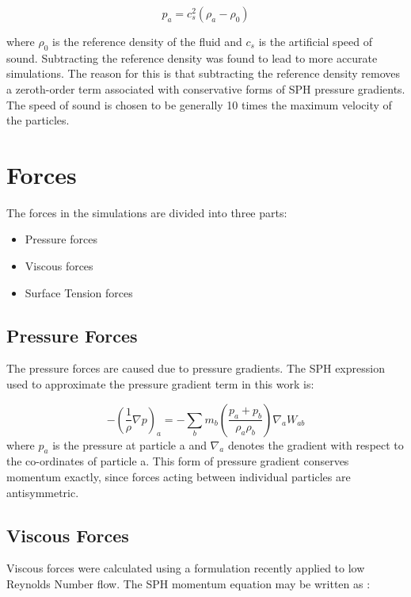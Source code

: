 \begin{equation}
 p_a = c_s^2 (\rho_a - \rho_0)
\end{equation}

\noindent
where $\rho_0$ is the reference density of the fluid and $c_s$ is the artificial speed of sound. Subtracting the reference density was found to lead to more accurate simulations. The reason for this is that subtracting the reference density removes a zeroth-order term associated with conservative forms of SPH pressure gradients. The speed of sound is chosen to be generally 10 times the maximum velocity of the particles. 

\section{Forces}

The forces in the simulations are divided into three parts:

\begin{itemize}
 \item Pressure forces
 \item Viscous forces
 \item Surface Tension forces
\end{itemize}

\subsection{Pressure Forces}

The pressure forces are caused due to pressure gradients. The SPH expression used to approximate the pressure gradient term in this work is:

\begin{equation}
 -\left( \frac{1}{\rho} \nabla p\right)_a = -\sum_b m_b \left( \frac{p_a + p_b}{\rho_a \rho_b}\right) \nabla_a W_{ab}
\end{equation}
\noindent
where $p_a$ is the pressure at particle a and $\nabla_a$ denotes the gradient with respect to the co-ordinates of particle a. This form of pressure gradient conserves momentum exactly, since forces acting between individual particles are antisymmetric.

\subsection{Viscous Forces}

Viscous forces were calculated using a formulation recently applied to low Reynolds Number flow. \citep{viscous} The SPH momentum equation may be written as \citep{viscous}:

